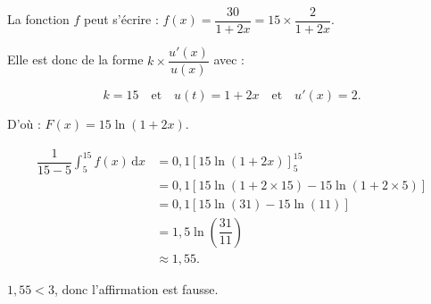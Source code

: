 \medskip

La fonction $f$ peut s'écrire : 
$f(x) = \dfrac{30}{1 + 2x} = 15\times\dfrac{2}{1 + 2x}$.

Elle est donc de la forme $k\times\dfrac{u'(x)}{u(x)}$ avec :

\[k = 15 \quad \text{et} \quad u(t) = 1 + 2x \quad \text{et} \quad u'(x) = 2.\]

D'où : $F(x) = 15\ln(1 + 2x)$.

\begin{align*}
\displaystyle\dfrac{1}{15 - 5}\int_5^{15} f(x)\,\text{d}x &= 0,1[15\ln(1 + 2x)]_5^{15} \\
&= 0,1[15\ln(1 + 2\times15) - 15\ln(1 + 2\times5)] \\
&= 0,1[15\ln(31)-15\ln(11)] \\
&= 1,5\ln\left(\dfrac{31}{11}\right) \\
&\approx 1,55.
\end{align*}

$1,55<3$, donc l'affirmation est fausse.

\bigskip
